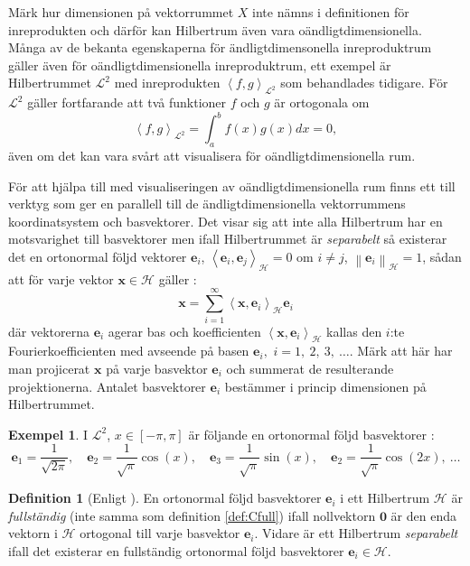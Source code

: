 \documentclass[a4paper, 12pt]{report}
\theoremstyle{definition}
\newtheorem{defi}{Definition}[section]
\newtheorem{ex}{Exempel}[section]
\theoremstyle{remark}
\newcommand{\bfx}{\mathbf{x}}
\newcommand{\llangle}{\left\langle}
\newcommand{\rrangle}{\right\rangle}
\newcommand{\inner}[2]{\llangle #1, #2 \rrangle}
\newcommand{\hil}{\mathcal{H}}
\begin{document}
Märk hur dimensionen på vektorrummet $X$ inte nämns i definitionen för inreprodukten och därför kan Hilbertrum även vara oändligtdimensionella. Många av de bekanta egenskaperna för ändligtdimensonella inreproduktrum gäller även för oändligtdimensionella inreproduktrum, ett exempel är Hilbertrummet $\mathcal{L}^2$ med inreprodukten $\inner{f}{g}_{\mathcal{L}^2}$ som behandlades tidigare. För $\mathcal{L}^2$ gäller fortfarande att två funktioner $f$ och $g$ är ortogonala om
\begin{equation*}
	\inner{f}{g}_{\mathcal{L}^2}=\int_{a}^{b}f(x)g(x)dx=0,
\end{equation*}
även om det kan vara svårt att visualisera för oändligtdimensionella rum.

För att hjälpa till med visualiseringen av oändligtdimensionella rum finns ett till verktyg som ger en parallell till de ändligtdimensionella vektorrummens koordinatsystem och basvektorer. Det visar sig att inte alla Hilbertrum har en motsvarighet till basvektorer men ifall Hilbertrummet är \emph{separabelt} så existerar det en ortonormal följd vektorer $\mathbf{e}_i$, $\inner{\mathbf{e}_i}{\mathbf{e}_j}_\hil=0$ om $i\neq j$, $\left\|\mathbf{e}_i\right\|_\hil=1$, sådan att för varje vektor $\mathbf{x}\in \mathcal{H}$  gäller \cite{Young}:
\begin{equation*}
\mathbf{x}=\sum_{i=1}^{\infty}\left\langle \mathbf{x}, \mathbf{e}_i \right\rangle_\hil \mathbf{e}_i
\end{equation*}
där vektorerna $\mathbf{e}_i$ agerar bas och koefficienten $\left\langle \mathbf{x}, \mathbf{e}_i \right\rangle_\hil$ kallas den $i$:te Fourierkoefficienten med avseende på basen $\mathbf{e}_i,$ $i=1,~2,~3,~\dots$.
Märk att här har man projicerat $\bfx$ på varje basvektor $\mathbf{e}_i$ och summerat de resulterande projektionerna.
Antalet basvektorer $\mathbf{e}_i$ bestämmer i princip dimensionen på Hilbertrummet.

\begin{ex}
I $\mathcal{L}^2$, $x\in\left[-\pi,\pi\right]$ är följande en ortonormal följd basvektorer \cite{Young}:
\begin{equation*}
	\mathbf{e}_1=\frac{1}{\sqrt{2\pi}},\quad\mathbf{e}_2=\frac{1}{\sqrt{\pi}}\cos\left(x\right),\quad\mathbf{e}_3=\frac{1}{\sqrt{\pi}}\sin\left(x\right),\quad\mathbf{e}_2=\frac{1}{\sqrt{\pi}}\cos\left(2x\right),~\dots
\end{equation*}
\end{ex}

\begin{defi}[Enligt \cite{Young}]
	En ortonormal följd basvektorer $\mathbf{e}_i$ i ett Hilbertrum $\hil$ är \emph{fullständig} (inte samma som definition \ref{def:Cfull}) ifall nollvektorn $\mathbf{0}$ är den enda vektorn i $\hil$ ortogonal till varje basvektor $\mathbf{e}_i$. Vidare är ett Hilbertrum \emph{separabelt} ifall det existerar en fullständig ortonormal följd basvektorer $\mathbf{e}_i\in\hil$.
\end{defi}
\end{document}
